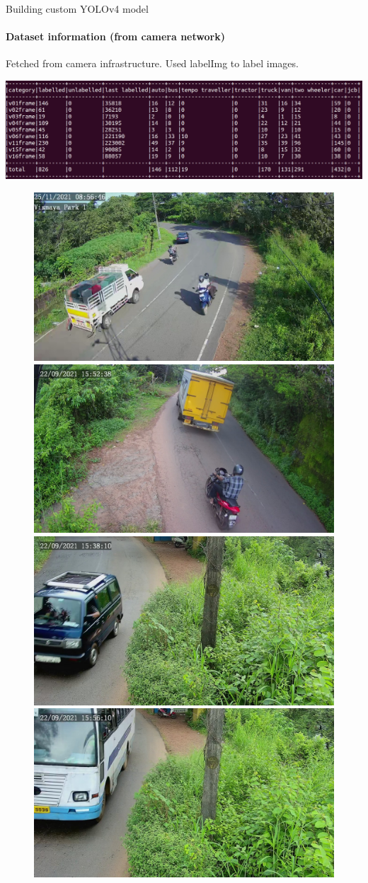 \documentclass{beamer}
\begin{document}
	\begin{frame}[allowframebreaks]{Building custom YOLOv4 model}
		\framesubtitle{Dataset information (from camera network)}
		Fetched from camera infrastructure. Used labelImg to label images.
		\begin{center}
			\includegraphics[width=\linewidth]{res/data_set2/custom_label_stat}
		\end{center}
		
		\newpage
		\begin{figure}
			\includegraphics[width=0.48\linewidth]{"res/data_set2/image1"} \hfill
			\includegraphics[width=0.48\linewidth]{"res/data_set2/image2"}
			\\[\smallskipamount]
			\includegraphics[width=0.48\linewidth]{"res/data_set2/image3"} \hfill
			\includegraphics[width=0.48\linewidth]{"res/data_set2/image4"}
		\end{figure}
	\end{frame}
\end{document}
